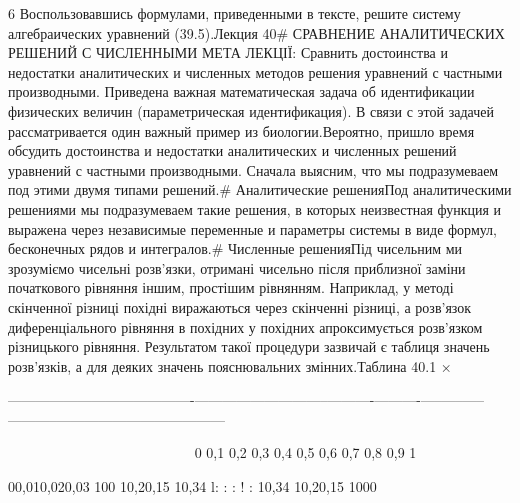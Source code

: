 \documentclass[
  ukrainian,
]{article}
\begin{document}
6 Воспользовавшись формулами, приведенными в тексте, решите систему
алгебраических уравнений (39.5).Лекция 40\# СРАВНЕНИЕ АНАЛИТИЧЕСКИХ
РЕШЕНИЙ С ЧИСЛЕННЫМИ МЕТА ЛЕКЦІЇ: Сравнить достоинства и недостатки
аналитических и численных методов решения уравнений с частными
производными. Приведена важная математическая задача об идентификации
физических величин (параметрическая идентификация). В связи с этой
задачей рассматривается один важный пример из биологии.Вероятно, пришло
время обсудить достоинства и недостатки аналитических и численных
решений уравнений с частными производными. Сначала выясним, что мы
подразумеваем под этими двумя типами решений.\# Аналитические решенияПод
аналитическими решениями мы подразумеваем такие решения, в которых
неизвестная функция и выражена через независимые переменные и параметры
системы в виде формул, бесконечных рядов и интегралов.\# Численные
решенияПід чисельним ми зрозуміємо чисельні розв'язки, отримані чисельно
після приблизної заміни початкового рівняння іншим, простішим рівнянням.
Наприклад, у методі скінченної різниці похідні виражаються через
скінченні різниці, а розв'язок диференціального рівняння в похідних у
похідних апроксимується розв'язком різницького рівняння. Результатом
такої процедури зазвичай є таблиця значень розв'язків, а для деяких
значень пояснювальних змінних.Таблина 40.1\textbar{} \textbar{} ×
\textbar{} \textbar{} \textbar{} \textbar{} \textbar{} \textbar{}
\textbar{} \textbar{} \textbar{} \textbar{} \textbar{}

\textbar---------------------------\textbar-------------\textbar------------------\textbar-----------\textbar----------\textbar----------\textbar-----\textbar-----\textbar-----\textbar-----------\textbar------------------\textbar------------------\textbar{}

~~~~~~~~~~~~~~~~~~~~~~~~~~\textbar{} 0 \textbar{} 0,1 \textbar{} 0,2
\textbar{} 0,3 \textbar{} 0,4 \textbar{} 0,5 \textbar{} 0,6 \textbar{}
0,7 \textbar{} 0,8 \textbar{} 0,9 \textbar{} 1 \textbar{}

00,010,020,03 \textbar{} 100 \textbar{} 10,20,15 \textbar{} 10,34
\textbar{} l: \textbar{} : \textbar{} : \textbar{} ! \textbar{} :
\textbar{} 10,34 \textbar{} 10,20,15 \textbar{} 1000 \textbar{}
\end{document}
